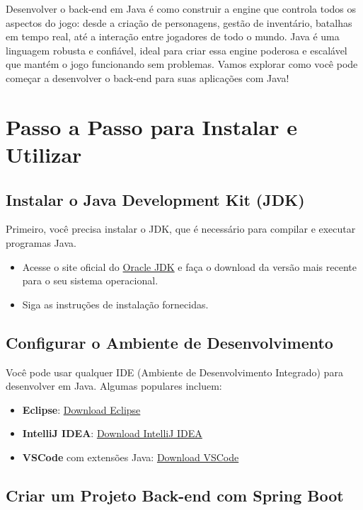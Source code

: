 \documentclass[a4paper,12pt]{book}
\begin{document}
Desenvolver o back-end em Java é como construir a engine que controla todos os aspectos do jogo: desde a criação de personagens, gestão de inventário, batalhas em tempo real, até a interação entre jogadores de todo o mundo. Java é uma linguagem robusta e confiável, ideal para criar essa engine poderosa e escalável que mantém o jogo funcionando sem problemas. Vamos explorar como você pode começar a desenvolver o back-end para suas aplicações com Java!

\section{Passo a Passo para Instalar e Utilizar}

\subsection{Instalar o Java Development Kit (JDK)}

Primeiro, você precisa instalar o JDK, que é necessário para compilar e executar programas Java.
\begin{itemize}
    \item Acesse o site oficial do \href{https://www.oracle.com/java/technologies/javase-downloads.html}{Oracle JDK} e faça o download da versão mais recente para o seu sistema operacional.
    \item Siga as instruções de instalação fornecidas.
\end{itemize}

\subsection{Configurar o Ambiente de Desenvolvimento}

Você pode usar qualquer IDE (Ambiente de Desenvolvimento Integrado) para desenvolver em Java. Algumas populares incluem:
\begin{itemize}
    \item \textbf{Eclipse}: \href{https://www.eclipse.org/downloads/}{Download Eclipse}
    \item \textbf{IntelliJ IDEA}: \href{https://www.jetbrains.com/idea/download/}{Download IntelliJ IDEA}
    \item \textbf{VSCode} com extensões Java: \href{https://code.visualstudio.com/}{Download VSCode}
\end{itemize}

\subsection{Criar um Projeto Back-end com Spring Boot}
\end{document}
